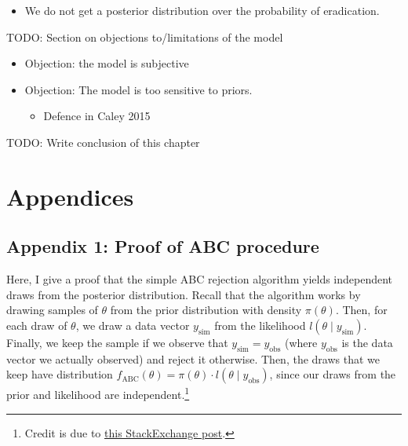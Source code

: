\documentclass[
]{book}
\providecommand{\tightlist}{%
  \setlength{\itemsep}{0pt}\setlength{\parskip}{0pt}}
\begin{document}
\begin{itemize}
\tightlist
\item
  We do not get a posterior distribution over the probability of eradication.
\end{itemize}

TODO: Section on objections to/limitations of the model

\begin{itemize}
\tightlist
\item
  Objection: the model is subjective
\item
  Objection: The model is too sensitive to priors.

  \begin{itemize}
  \tightlist
  \item
    Defence in Caley 2015
  \end{itemize}
\end{itemize}

TODO: Write conclusion of this chapter

\renewcommand{\baselinestretch}{1}\normalsize

\hypertarget{appendices}{%
\chapter{Appendices}\label{appendices}}

\hypertarget{appendix-1-proof-of-abc-procedure}{%
\section{Appendix 1: Proof of ABC procedure}\label{appendix-1-proof-of-abc-procedure}}

Here, I give a proof that the simple ABC rejection algorithm yields independent draws from the posterior distribution. Recall that the algorithm works by drawing samples of \(\theta\) from the prior distribution with density \(\pi (\theta)\). Then, for each draw of \(\theta\), we draw a data vector \(y_{\text {sim}}\) from the likelihood \(l(\theta \mid y_{\text{sim}})\). Finally, we keep the sample if we observe that \(y_{\text{sim}} = y_{\text{obs}}\) (where \(y_{\text{obs}}\) is the data vector we actually observed) and reject it otherwise. Then, the draws that we keep have distribution \(f_{\text{ABC}}(\theta) = \pi(\theta) \cdot l(\theta \mid y_{\text{obs}})\), since our draws from the prior and likelihood are independent.\footnote{Credit is due to \href{https://stats.stackexchange.com/questions/380076/proof-of-approximate-exact-bayesian-computation.}{this StackExchange post}.}
\end{document}
